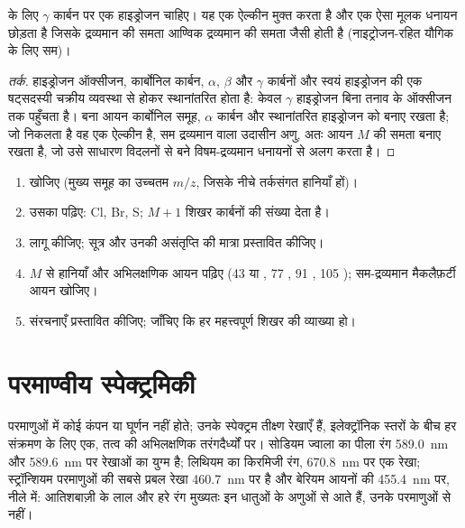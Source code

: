 \begin{proposition}\label{prop:b2:mass-spec-atomic:mclafferty}
 के लिए $\gamma$ कार्बन पर एक हाइड्रोजन चाहिए। यह एक ऐल्कीन मुक्त करता है और
एक ऐसा मूलक धनायन छोड़ता है जिसके द्रव्यमान की समता आण्विक द्रव्यमान की समता जैसी होती है (नाइट्रोजन-रहित यौगिक के लिए
सम)।
\end{proposition}

\begin{proof}[तर्क]
हाइड्रोजन ऑक्सीजन, कार्बोनिल
कार्बन, $\alpha$, $\beta$ और $\gamma$ कार्बनों और स्वयं हाइड्रोजन की एक षट्सदस्यी चक्रीय व्यवस्था से होकर स्थानांतरित होता है: केवल $\gamma$ हाइड्रोजन
बिना तनाव के ऑक्सीजन तक पहुँचता है। बना आयन कार्बोनिल समूह, $\alpha$ कार्बन और
स्थानांतरित हाइड्रोजन को बनाए रखता है; जो निकलता है वह एक ऐल्कीन है, सम द्रव्यमान वाला उदासीन अणु, अतः आयन $M$ की
समता बनाए रखता है, जो उसे साधारण विदलनों से बने विषम-द्रव्यमान धनायनों से अलग करता है।
\end{proof}

\begin{method}[द्रव्यमान स्पेक्ट्रम पढ़ना]\label{met:b2:mass-spec-atomic:read-ms}
\begin{enumerate}
  \item {} खोजिए (मुख्य समूह का उच्चतम $m/z$, जिसके नीचे तर्कसंगत हानियाँ हों)।
  \item उसका  पढ़िए: Cl, Br, S; $M+1$ शिखर कार्बनों की संख्या देता है।
  \item {} लागू कीजिए; सूत्र और उनकी असंतृप्ति की मात्रा प्रस्तावित कीजिए।
  \item $M$ से हानियाँ और अभिलक्षणिक आयन पढ़िए (43  या , 77
        , 91 , 105 ); सम-द्रव्यमान मैकलैफ़र्टी आयन खोजिए।
  \item संरचनाएँ प्रस्तावित कीजिए; जाँचिए कि हर महत्त्वपूर्ण शिखर की व्याख्या हो।
\end{enumerate}
\end{method}

\section{परमाण्वीय स्पेक्ट्रमिकी}

परमाणुओं में कोई कंपन या घूर्णन नहीं होते; उनके स्पेक्ट्रम तीक्ष्ण रेखाएँ हैं, इलेक्ट्रॉनिक स्तरों के बीच
हर संक्रमण के लिए एक, तत्व की अभिलक्षणिक तरंगदैर्ध्यों पर। सोडियम ज्वाला का पीला रंग
\qty{589.0}{nm} और \qty{589.6}{nm} पर रेखाओं का युग्म है; लिथियम का किरमिजी रंग, \qty{670.8}{nm} पर एक रेखा;
स्ट्रॉन्शियम परमाणुओं की सबसे प्रबल रेखा \qty{460.7}{nm} पर है और बेरियम आयनों की
\qty{455.4}{nm} पर, नीले में: आतिशबाज़ी के लाल और हरे रंग मुख्यतः इन
धातुओं के अणुओं से आते हैं, उनके परमाणुओं से नहीं।

